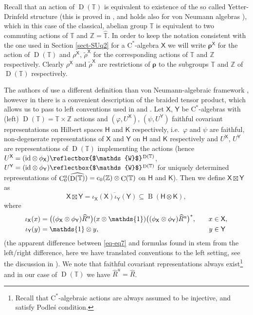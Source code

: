 \documentclass[12pt,reqno,a4paper]{amsart}
\theoremstyle{definition}
\newcommand{\cst}{\ensuremath{\mathrm{C}^*}}
\newcommand{\ph}{\varphi}
\newcommand{\hh}[1]{\widehat{#1}}
\newcommand{\I}{\mathds{1}}
\newcommand{\id}{\mathrm{id}}
\newcommand{\tens}{\otimes}
\newcommand{\TT}{\mathbb{T}}
\newcommand{\ZZ}{\mathbb{Z}}
\newcommand{\sH}{\mathsf{H}}
\newcommand{\sK}{\mathsf{K}}
\newcommand{\sX}{\mathsf{X}}
\newcommand{\sY}{\mathsf{Y}}
\newcommand{\brho}{{\boldsymbol{\rho}}}
\newcommand{\uu}{\text{\rm u}}
\newcommand{\Ww}{\mathds{W}}
\newcommand{\wW}{\text{\reflectbox{$\Ww$}}\:\!}
\DeclareMathOperator{\B}{B}
\DeclareMathOperator{\C}{C}
\DeclareMathOperator{\D}{D}
\numberwithin{equation}{section}
\begin{document}
\begin{appendices}
Recall that an action of $\D(\TT)$ is equivalent to existence of the so called Yetter-Drinfeld structure (this is proved in \cite[Proposition 3.2]{NestVoigt}, and holds also for von Neumann algebras \cite[Proposition 2.9]{DeCommerKrajczok}), which in this case of the classical, abelian group $\TT$ is equivalent to two commuting actions of $\TT$ and $\ZZ=\hh{\TT}$. In order to keep the notation consistent with the one used in Section \ref{sect-SUq2} for a \cst-algebra $\sX$ we will write $\brho^\sX$ for the action of $\D(\TT)$ and $\rho^\sX$, $\tilde{\rho}^\sX$ for the corresponding actions of $\TT$ and $\ZZ$ respectively. Clearly $\rho^\sX$ and $\tilde{\rho}^\sX$ are restrictions of $\brho$ to the subgroups $\TT$ and $\ZZ$ of $\D(\TT)$ respectively.

The authors of \cite{MeyerRoyWoronowiczI, MeyerRoyWoronowiczII} use a different definition than von Neumann-algebraic framework \cite{DeCommerKrajczok}, however in \cite[Section 4]{MeyerRoyWoronowiczII} there is a convenient description of the braided tensor product, which allows us to pass to left conventions used in \cite{DeCommerKrajczok} and \cite{BraidedSU2}. Let $\sX$, $\sY$ be \cst-algebras with (left) $\D(\TT)=\TT\times\ZZ$ actions and $(\ph,U^{\sX})$, $(\psi,U^{\sY})$ faithful covariant representations on Hilbert spaces $\sH$ and $\sK$ respectively, i.e.~$\ph$ and $\psi$ are faithful, non-degenerate representations of $\sX$ and $\sY$ on $\sH$ and $\sK$ respectively and $U^\sX$, $U^\sY$ are representations of $\D(\TT)$ implementing the actions (hence $U^\sX=(\id\tens\phi_\sX)\wW^{\D(\TT)}$, $U^\sY=(\id\tens\phi_\sY)\wW^{\D(\TT)}$ for uniquely determined representations of $\C_0^\uu(\hh{\D(\TT)})=\mathrm{c}_0(\ZZ)\tens\C(\TT)$ on $\sH$ and $\sK$). Then we define $\sX\boxtimes\sY$ as
\[
\sX\boxtimes\sY=\overline{\iota_\sX(\sX)\iota_\sY(\sY)}\subseteq\B(\sH\tens\sK),
\]
where
\begin{equation}\label{eq-eq7}
\begin{aligned}
\iota_\sX(x)
&=\bigl((\phi_\sX\tens\phi_\sY)\hh{R}^\uu\bigr)(x\tens\I)\bigl((\phi_\sX\tens\phi_\sY)\hh{R}^\uu\bigr)^*,&\quad x&\in\sX,\\
\iota_\sY(y)&=\I\tens y,&\quad y&\in\sY
\end{aligned}
\end{equation}
(the apparent difference between \eqref{eq-eq7} and formulas found in \cite{MeyerRoyWoronowiczII} stem from the left/right difference, here we have translated conventions to the left setting, see the discussion in \cite[Section 9.2]{DeCommerKrajczok}). We note that faithful covariant representations always exist\footnote{Recall that \cst-algebraic actions are always assumed to be injective, and satisfy Podle\'s condition.} and in our case of $\D(\TT)$ we have $\hh{R}^u=\hh{R}$.


\end{appendices}
\end{document}
